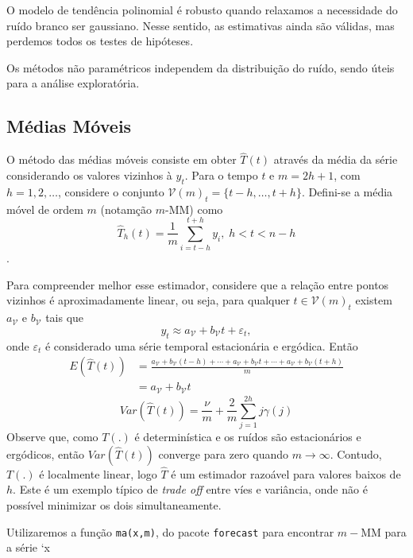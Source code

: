 \documentclass[
  letterpaper,
  DIV=11,
  numbers=noendperiod]{scrartcl}
\theoremstyle{definition}
\theoremstyle{definition}
\theoremstyle{plain}
\theoremstyle{plain}
\theoremstyle{remark}
\begin{document}
O modelo de tendência polinomial é robusto quando relaxamos a
necessidade do ruído branco ser gaussiano. Nesse sentido, as estimativas
ainda são válidas, mas perdemos todos os testes de hipóteses.

Os métodos não paramétricos independem da distribuição do ruído, sendo
úteis para a análise exploratória.

\subsection{Médias Móveis}\label{muxe9dias-muxf3veis}

O método das médias móveis consiste em obter \(\hat{T}(t)\) através da
média da série considerando os valores vizinhos à \(y_t\). Para o tempo
\(t\) e \(m=2h+1\), com \(h=1,2,\ldots\), considere o conjunto
\(\mathcal{V}(m)_t=\{t-h,\ldots,t+h\}\). Defini-se a média móvel de
ordem \(m\) (notamção \(m\)-MM) como
\[\hat{T}_h(t)=\frac{1}{m}\sum_{ i = t-h}^{t+h}y_i,\;h<t<n-h\].

Para compreender melhor esse estimador, considere que a relação entre
pontos vizinhos é aproximadamente linear, ou seja, para qualquer
\(t\in\mathcal{V}(m)_t\) existem \(a_\mathcal{V}\) e \(b_\mathcal{V}\)
tais que \[y_t\approx a_\mathcal{V}+b_\mathcal{V}t+\varepsilon_t,\] onde
\(\varepsilon_t\) é considerado uma série temporal estacionária e
ergódica. Então
\begin{align}E(\hat{T}(t))&=\frac{a_\mathcal{V}+b_\mathcal{V}(t-h)+\cdots+a_\mathcal{V}+b_\mathcal{V}t+\cdots+a_\mathcal{V}+b_\mathcal{V}(t+h)}{m}\\&=a_\mathcal{V}+b_\mathcal{V}t\end{align}
\[Var(\hat{T}(t))=\frac{\nu}{m}+\frac{2}{m}\sum_{j=1}^{2h}j\gamma(j)\]
Observe que, como \(T(.)\) é determinística e os ruídos são
estacionários e ergódicos, então \(Var(\hat{T}(t))\) converge para zero
quando \(m\rightarrow \infty\). Contudo, \(T(.)\) é localmente linear,
logo \(\hat{T}\) é um estimador razoável para valores baixos de \(h\).
Este é um exemplo típico de \emph{trade off} entre víes e variância,
onde não é possível minimizar os dois simultaneamente.

Utilizaremos a função \texttt{ma(x,m)}, do pacote \texttt{forecast} para
encontrar \(m-\)MM para a série `x
\end{document}
